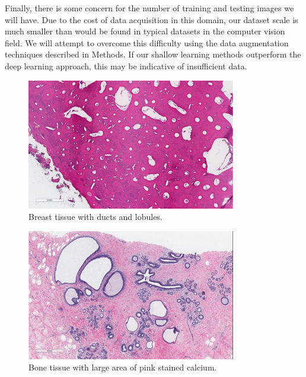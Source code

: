 \documentclass[10pt,twocolumn,letterpaper]{article}
\begin{document}
Finally, there is some concern for the number of training and testing images
we will have. Due to the cost of data acquisition in this domain, our dataset
scale is much smaller than would be found in typical datasets in the computer
vision field. We will attempt to overcome this difficulty using the data
augmentation techniques described in Methods. If our shallow learning
methods outperform the deep learning approach, this may be indicative of
insufficient data.

\begin{figure}[h]
\begin{center}
   \includegraphics[width=0.9\linewidth]{figures/image00.png}
\end{center}
    \caption
    {%
        Breast tissue with ducts and lobules.
    }
\label{fig:breast}
\end{figure}

\begin{figure}[h]
\begin{center}
   \includegraphics[width=0.9\linewidth]{figures/image01.png}
\end{center}
    \caption
    {%
        Bone tissue with large area of pink stained calcium.
    }
\label{fig:bone}
\end{figure}
\end{document}
